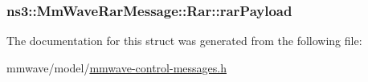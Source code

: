 \subsubsection[{\texorpdfstring{rar\+Payload}{rarPayload}}]{ ns3\+::\+Mm\+Wave\+Rar\+Message\+::\+Rar\+::rar\+Payload}\hypertarget{structns3_1_1MmWaveRarMessage_1_1Rar_a32b670d0695d5e29d480ee2b5a92f0da}{}\label{structns3_1_1MmWaveRarMessage_1_1Rar_a32b670d0695d5e29d480ee2b5a92f0da}


The documentation for this struct was generated from the following file\+:\begin{DoxyCompactItemize}
\item 
mmwave/model/\hyperlink{mmwave-control-messages_8h}{mmwave-\/control-\/messages.\+h}\end{DoxyCompactItemize}
